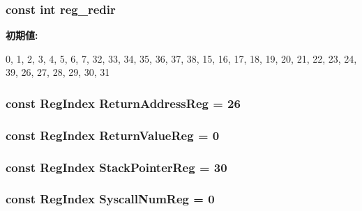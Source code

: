 \label{namespaceAlphaISA_af2c06ba3a5eb15cdac25d21b735b7161}
\hypertarget{namespaceAlphaISA_a29caebb462e412f2fced9b28d889cbde}{
\subsubsection[{reg\_\-redir}]{\setlength{\rightskip}{0pt plus 5cm}const int {\bf reg\_\-redir}}}
\label{namespaceAlphaISA_a29caebb462e412f2fced9b28d889cbde}
{\bfseries 初期値:}
\begin{DoxyCode}
 {
     0, 1, 2, 3, 4, 5, 6, 7,
     32, 33, 34, 35, 36, 37, 38, 15,
     16, 17, 18, 19, 20, 21, 22, 23,
     24, 39, 26, 27, 28, 29, 30, 31 }
\end{DoxyCode}
\hypertarget{namespaceAlphaISA_ac35e74d63805165abcadf5e48ba17caf}{
\subsubsection[{ReturnAddressReg}]{\setlength{\rightskip}{0pt plus 5cm}const {\bf RegIndex} {\bf ReturnAddressReg} = 26}}
\label{namespaceAlphaISA_ac35e74d63805165abcadf5e48ba17caf}
\hypertarget{namespaceAlphaISA_a5aa17c403dc1152a73ef61c17f4e02cf}{
\subsubsection[{ReturnValueReg}]{\setlength{\rightskip}{0pt plus 5cm}const {\bf RegIndex} {\bf ReturnValueReg} = 0}}
\label{namespaceAlphaISA_a5aa17c403dc1152a73ef61c17f4e02cf}
\hypertarget{namespaceAlphaISA_a344fcaf70f4d9d6fe84dc5eda59e49eb}{
\subsubsection[{StackPointerReg}]{\setlength{\rightskip}{0pt plus 5cm}const {\bf RegIndex} {\bf StackPointerReg} = 30}}
\label{namespaceAlphaISA_a344fcaf70f4d9d6fe84dc5eda59e49eb}
\hypertarget{namespaceAlphaISA_a208b182e71958af642826cde032dcd60}{
\subsubsection[{SyscallNumReg}]{\setlength{\rightskip}{0pt plus 5cm}const {\bf RegIndex} {\bf SyscallNumReg} = 0}}
